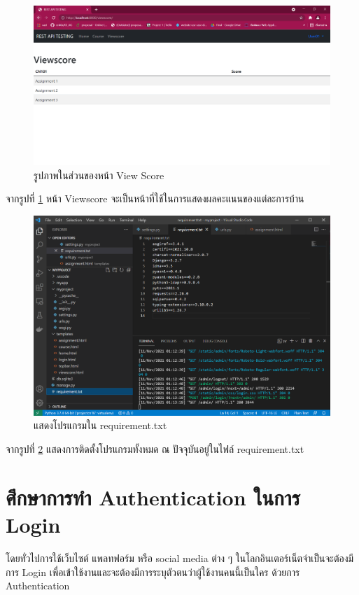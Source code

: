 \begin{figure}[!thb]
	\captionsetup{justification=centering}
	\centering
	\includegraphics[width=5in]{figures/score.png}
	\caption{รูปภาพในส่วนของหน้า View Score}
	\label{fig:score}
\end{figure}
\noindent จากรูปที่ \ref{fig:score} หน้า Viewscore จะเป็นหน้าที่ใช้ในการแสดงผลคะแนนของแต่ละ\mbox{การบ้าน}
\begin{figure}[!thb]
	\captionsetup{justification=centering}
	\centering
	\includegraphics[width=5in]{figures/code.png}
	\caption{แสดงโปรแกรมใน requirement.txt}
	\label{fig:code}
\end{figure}
\newline
จากรูปที่ \ref{fig:code} แสดงการติดตั้งโปรแกรมทั้งหมด ณ ปัจจุบันอยู่ในไฟล์ requirement.txt
\newpage

\section{ศึกษาการทำ Authentication ในการ Login }
โดยทั่วไปการใช้เว็บไซต์ แพลทฟอร์ม หรือ social media ต่าง ๆ ในโลกอินเตอร์เน็ต\mbox{จำเป็น}จะต้องมีการ Login เพื่อเข้าใช้งานและจะต้องมีการระบุตัวตนว่าผู้ใช้งานคนนี้เป็นใคร ด้วยการ Authentication

